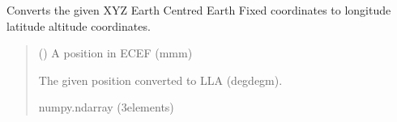 \documentclass[letterpaper,10pt,english]{sphinxmanual}
\begin{document}

\begin{fulllineitems}
\label{\detokenize{modules/util/transformations:qnav.util.transformations.ecef2lla}}
\pysigstartsignatures
{}
\pysigstopsignatures
\sphinxAtStartPar
Converts the given XYZ Earth Centred Earth Fixed coordinates to
longitude latitude altitude coordinates.
\begin{quote}\begin{description}
\sphinxAtStartPar
{} (\sphinxstyleliteralemphasis{\sphinxupquote{ (}}\sphinxstyleliteralemphasis{\sphinxupquote{)}}) \textendash{} A position in ECEF (m\sphinxhyphen{}m\sphinxhyphen{}m)

\sphinxAtStartPar
The given position converted to LLA (deg\sphinxhyphen{}deg\sphinxhyphen{}m).

\sphinxAtStartPar
numpy.ndarray (3\sphinxhyphen{}elements)

\end{description}\end{quote}

\end{fulllineitems}

\end{document}
